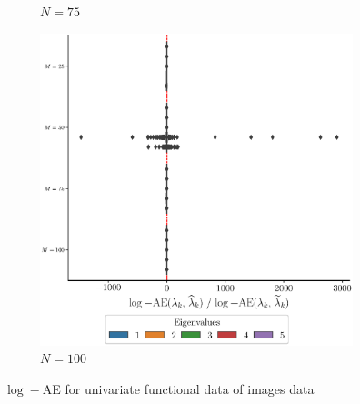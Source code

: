 \begin{results}
\begin{figure}
\begin{subfigure}[b]{0.49\textwidth}
         \caption{$N = 75$}
         \label{fig:logAE_mfd_2d_75}
     \end{subfigure}
     \begin{subfigure}[b]{0.49\textwidth}
         \centering
         \includegraphics[width=\textwidth]{figures/scenario_2/logAE_N100.eps}
         \caption{$N = 100$}
         \label{fig:logAE_mfd_2d_100}
    \end{subfigure}
    \caption{$\log-$AE for univariate functional data of images data}
    \label{fig:logAE_mfd_2d}
\end{figure}

\end{results}

